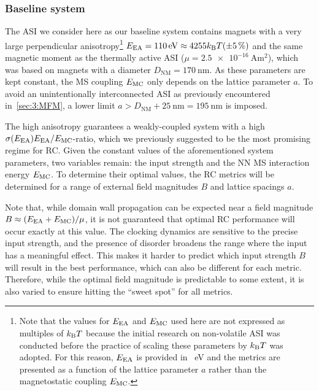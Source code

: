 \subsubsection{Baseline system}
The ASI we consider here as our baseline system contains magnets with a very large perpendicular anisotropy\footnote{
	Note that the values for $E_\mathrm{EA}$ and $E_\mathrm{MC}$ used here are not expressed as multiples of $\kBT$ because the initial research on non-volatile ASI was conducted before the practice of scaling these parameters by $\kBT$ was adopted.
	For this reason, $E_\mathrm{EA}$ is provided in \SI{}{\electronvolt} and the metrics are presented as a function of the lattice parameter $a$ rather than the magnetostatic coupling $E_\mathrm{MC}$.
} $\EEA = \SI{110}{\electronvolt} \approx 4255\kBT (\pm \SI{5}{\percent})$ and the same magnetic moment as the thermally active ASI ($\mu = \SI{2.5e-16}{\ampere\metre\squared}$), which was based on magnets with a diameter $D_\mathrm{NM} = \SI{170}{\nano\metre}$.
As these parameters are kept constant, the MS coupling $E_\mathrm{MC}$ only depends on the lattice parameter $a$.
To avoid an unintentionally interconnected ASI as previously encountered in~\cref{sec:3:MFM}, a lower limit $a > D_\mathrm{NM} + \SI{25}{\nano\metre} = \SI{195}{\nano\metre}$ is imposed. \par
The high anisotropy guarantees a weakly-coupled system with a high $\sigma(E_\mathrm{EA})E_\mathrm{EA} / E_\mathrm{MC}$-ratio, which we previously suggested to be the most promising regime for RC.
Given the constant values of the aforementioned system parameters, two variables remain: the input strength and the NN MS interaction energy $E_\mathrm{MC}$.
To determine their optimal values, the RC metrics will be determined for a range of external field magnitudes $B$ and lattice spacings $a$. \par
Note that, while domain wall propagation can be expected near a field magnitude $B \approx (E_\mathrm{EA} + E_\mathrm{MC})/\mu$, it is not guaranteed that optimal RC performance will occur exactly at this value.
The clocking dynamics are sensitive to the precise input strength, and the presence of disorder broadens the range where the input has a meaningful effect.
This makes it harder to predict which input strength $B$ will result in the best performance, which can also be different for each metric.
Therefore, while the optimal field magnitude is predictable to some extent, it is also varied to ensure hitting the ``sweet spot'' for all metrics.

